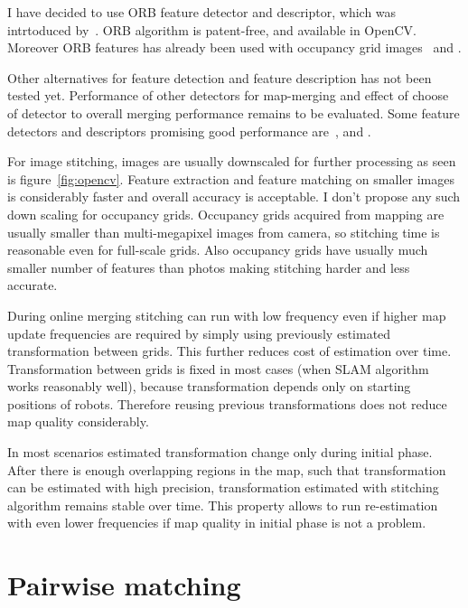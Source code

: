 I have decided to use \gls{ORB} feature detector and descriptor, which was intrtoduced by~\cite{Rublee2011}. \gls{ORB} algorithm is patent-free, and available in \gls{OpenCV}. Moreover \gls{ORB} features has already been used with occupancy grid images~\cite{MapstitchROS} and \cite{Andre2014}.

Other alternatives for feature detection and feature description has not been tested yet. Performance of other detectors for map-merging and effect of choose of detector to overall merging performance remains to be evaluated. Some feature detectors and descriptors promising good performance are~\cite{Alahi2012}, \cite{alcantarilla2011fast} and \cite{calonder2010brief}.

For image stitching, images are usually downscaled for further processing as seen is figure~\ref{fig:opencv}. Feature extraction and feature matching on smaller images is considerably faster and overall accuracy is acceptable. I don't propose any such down scaling for occupancy grids. Occupancy grids acquired from mapping are usually smaller than multi-megapixel images from camera, so stitching time is reasonable even for full-scale grids. Also occupancy grids have usually much smaller number of features than photos making stitching harder and less accurate.

During online merging stitching can run with low frequency even if higher map update frequencies are required by simply using previously estimated transformation between grids. This further reduces cost of estimation over time. Transformation between grids is fixed in most cases (when \gls{SLAM} algorithm works reasonably well), because transformation depends only on starting positions of robots. Therefore reusing previous transformations does not reduce map quality considerably.

In most scenarios estimated transformation change only during initial phase. After there is enough overlapping regions in the map, such that transformation can be estimated with high precision, transformation estimated with stitching algorithm remains stable over time. This property allows to run re-estimation with even lower frequencies if map quality in initial phase is not a problem.


\section{Pairwise matching} %
\label{sec:pairwisematching}

